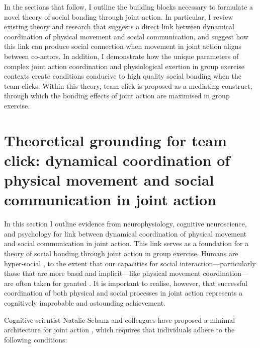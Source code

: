 \begin{CJK}{UTF8}{gbsn}
In the sections that follow, I outline the building blocks necessary to formulate a novel theory of social bonding through joint action.  In particular, I review existing theory and research that suggests a direct link between dynamical coordination of physical movement and social communication, and suggest how this link can produce social connection when movement in joint action aligns between co-actors.  In addition, I demonstrate how the unique parameters of complex joint action coordination and physiological exertion in group exercise contexts create conditions conducive to high quality social bonding when the team clicks.  Within this theory, team click is proposed as a mediating construct, through which the bonding effects of joint action are maximised in group exercise.







\section{Theoretical grounding for team click: dynamical coordination of physical movement and social communication in joint action}

In this section I outline evidence from neurophysiology, cognitive neuroscience, and psychology for link between dynamical coordination of physical movement and social communication in joint action.  This link serves as a foundation for a theory of social bonding through joint action in group exercise.  Humans are hyper-social \citep{Tomasello2012a}, to the extent that our capacities for social interaction---particularly those that are more basal and implicit---like physical movement coordination---are often taken for granted \citep{Wheatley2016}.  It is important to realise, however, that successful coordination of both physical and social processes in joint action represents a cognitively improbable and astounding achievement.

Cognitive scientist Natalie Sebanz and colleagues have proposed a minimal architecture for joint action \citep{Sebanz2006,Vesper2010}, which requires that individuals adhere to the following conditions:


\end{CJK}
